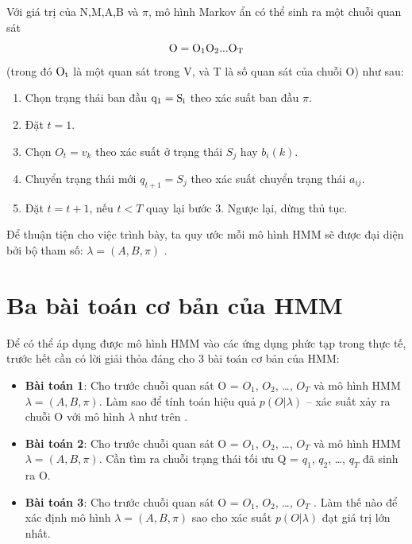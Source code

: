 \documentclass[13pt]{extreport}
\begin{document}
  Với giá trị của N,M,A,B và $\pi$, mô hình Markov ẩn có thể sinh ra một chuỗi quan sát $${\rm{O}} = {\rm{O}}_{\rm{1}}{\rm{O}}_{\rm{2}}...{\rm{O}}_{\rm{T}} $$ (trong đó ${\rm{O}}_{\rm{t}}$ là một quan sát trong V, và T là số quan sát của chuỗi O) như sau:
  \begin{enumerate}
  \item Chọn trạng thái ban đầu ${\rm{q}}_{\rm{1}} = {\rm{S}}_{\rm{i}}$ theo xác suất ban đầu $\pi$.
  \item Đặt $t = 1$.
  \item Chọn $O_t=v_k$ theo xác suất ở trạng thái $S_j$ hay $b_i(k)$.
  \item Chuyển trạng thái mới $q_{t+1}=S_j$ theo xác suất chuyển trạng thái $a_{ij}$.
  \item Đặt $t=t+1$, nếu $t<T$ quay lại bước 3. 
  Ngược lại, dừng thủ tục.
  \end{enumerate}
  Để thuận tiện cho việc trình bày, ta quy ước mỗi mô hình HMM sẽ được đại diện bởi bộ tham số: $  \lambda = \left( A,B, \pi  \right)  $
. \par
  

\section{Ba bài toán cơ bản của HMM}


Để có thể áp dụng được mô hình HMM vào các ứng dụng phức tạp trong thực tế, trước hết cần có lời giải thỏa đáng cho 3 bài toán cơ bản của HMM: \par
\begin{itemize}
\item\textbf{Bài toán 1}: Cho trước chuỗi quan sát O =   $O_1$, $O_2$, …, $O_T$  và mô hình HMM $  \lambda = \left( A,B, \pi  \right)  $.
 Làm sao để tính toán hiệu quả $ p \left( O \vert  \lambda  \right)  $
 – xác suất xảy ra chuỗi O với mô hình $  \lambda  $ như trên
. \par
\item \textbf{Bài toán 2}: Cho trước chuỗi quan sát O =   $O_1$, $O_2$, …, $O_T$  và mô hình HMM $  \lambda = \left( A,B, \pi  \right) . $
 Cần tìm ra chuỗi trạng thái tối ưu Q = $q_1$, $q_2$, …, $q_T$   đã sinh ra O. \par
\item \textbf{Bài toán 3}: Cho trước chuỗi quan sát O =   $O_1$, $O_2$, …, $O_T$ . Làm thế nào để xác định mô hình $  \lambda = \left( A,B, \pi  \right)  $
 sao cho xác suất $ p \left( O \vert  \lambda  \right)  $ đạt giá trị lớn nhất.
\end{itemize}
\end{document}
